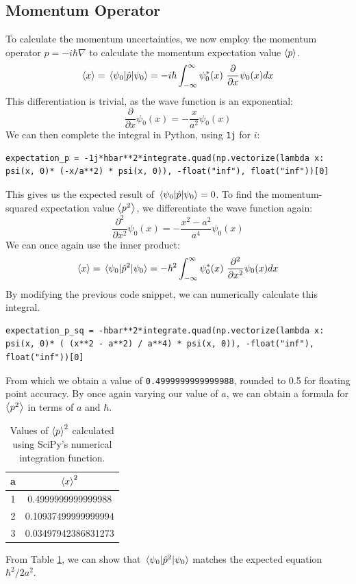 \documentclass[a4paper]{article}
\begin{document}
\subsection{Momentum Operator}
To calculate the momentum uncertainties, we now employ the momentum operator $\hat p=-i\hbar\nabla$ to calculate the momentum expectation value $\expval p$.
\begin{equation}
\expval x=\mel{\psi_0}{\hat p}{\psi_0}=-i\hbar\int^\infty_{-\infty}\psi_0^*(x)\ \frac\partial{\partial x} \psi_0(x)dx
\end{equation}
This differentiation is trivial, as the wave function is an exponential:
\begin{equation}
\frac\partial{\partial x} \psi_0(x) = -\frac x{a^2}\psi_0(x)
\end{equation}
We can then complete the integral in Python, using \lstinline$1j$ for $i$:
\begin{lstlisting}
expectation_p = -1j*hbar**2*integrate.quad(np.vectorize(lambda x: psi(x, 0)* (-x/a**2) * psi(x, 0)), -float("inf"), float("inf"))[0]
\end{lstlisting} This gives us the expected result of $\mel{\psi_0}{\hat p}{\psi_0}=0$.
To find the momentum-squared expectation value $\expval{p^2}$, we differentiate the wave function again:
\begin{equation}
\frac{\partial^2}{\partial x^2} \psi_0(x) = -\frac{x^2-a^2}{a^4}\psi_0(x)
\end{equation}
We can once again use the inner product:
\begin{equation}
\expval x=\mel{\psi_0}{\hat p^2}{\psi_0}=-\hbar^2\int^\infty_{-\infty}\psi_0^*(x)\ \frac{\partial^2}{\partial x^2} \psi_0(x)dx
\end{equation}
By modifying the previous code snippet, we can numerically calculate this integral.
\begin{lstlisting}
expectation_p_sq = -hbar**2*integrate.quad(np.vectorize(lambda x: psi(x, 0)* ( (x**2 - a**2) / a**4) * psi(x, 0)), -float("inf"), float("inf"))[0]
\end{lstlisting} From which we obtain a value of \lstinline$0.4999999999999988$, rounded to 0.5 for floating point accuracy. By once again varying our value of $a$, we can obtain a formula for $\expval{p^2}$ in terms of $a$ and $\hbar$.
\begin{table}[h!]
\centering
\begin{tabular}{cc}
a & $\expval x^2$ \\ \hline
1 & 0.4999999999999988  \\
2 & 0.10937499999999994 \\
3 & 0.03497942386831273
\end{tabular}
\caption{\label{tab:p_table}Values of $\expval p^2$ calculated using SciPy's numerical integration function.}
\end{table}

From Table \ref{tab:p_table}, we can show that $\mel{\psi_0}{\hat p^2}{\psi_0}$ matches the expected equation $\hbar^2/2a^2$.
\end{document}
